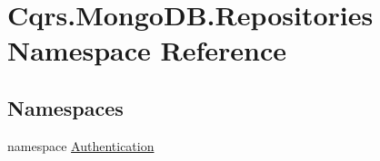 \hypertarget{namespaceCqrs_1_1MongoDB_1_1Repositories}{}\section{Cqrs.\+Mongo\+D\+B.\+Repositories Namespace Reference}
\label{namespaceCqrs_1_1MongoDB_1_1Repositories}
\subsection*{Namespaces}
\begin{DoxyCompactItemize}
\item 
namespace \hyperlink{namespaceCqrs_1_1MongoDB_1_1Repositories_1_1Authentication}{Authentication}
\end{DoxyCompactItemize}
